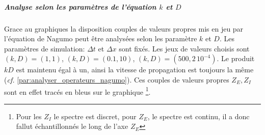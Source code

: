             \subparagraph{Analyse selon les paramètres de l'équation $k$ et $D$}
                Grace au graphiques  la disposition couples de valeurs 
                propres mis en jeu par l'équation de Nagumo peut être analysées selon les paramètre $k$ et $D$. Les paramètres de simulation: $\Delta t$ et $\Delta x$ sont fixés.
                Les jeux de valeurs choisis sont $(k,D)=(1,1)$, $(k,D)=(0.1,10)$, $(k,D)=(500,2\, 10^{-4})$. 
                Le produit $kD$ est maintenu égal à un, ainsi la vitesse de propagation est toujours la même (\emph{cf.} \ref{par:analyser_operateurs_nagumo}).
                Ces couples de valeurs propres $Z_E,Z_I$ sont en effet tracés en bleus sur le graphique
                \footnote{Pour les $Z_I$ le spectre est discret, pour $Z_E$, le spectre est continu, il a donc fallut échantillonnés le long de l'axe $Z_E$}.

